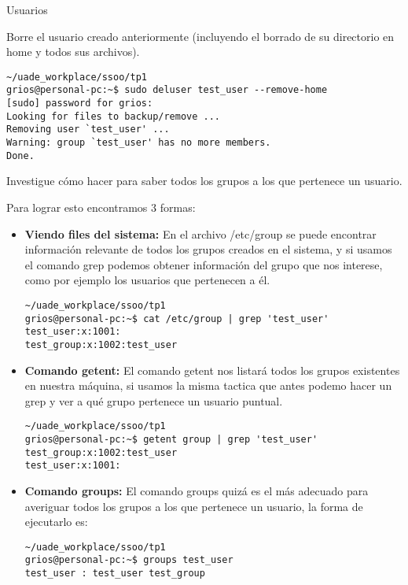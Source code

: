 \begin{section}{Usuarios}
\begin{quoting}
Borre el usuario creado anteriormente (incluyendo el borrado de su directorio en home y todos sus
archivos).
\end{quoting}

\begin{lstlisting}[style=Ubuntu]
~/uade_workplace/ssoo/tp1
grios@personal-pc:~$ sudo deluser test_user --remove-home  
[sudo] password for grios: 
Looking for files to backup/remove ...
Removing user `test_user' ...
Warning: group `test_user' has no more members.
Done.

\end{lstlisting}


\begin{quoting}
Investigue cómo hacer para saber todos los grupos a los que pertenece un usuario.
\end{quoting}

Para lograr esto encontramos 3 formas:

\begin{itemize}

\item \textbf{Viendo files del sistema:}
En el archivo /etc/group se puede encontrar información relevante de todos los grupos creados en el sistema, y si usamos el comando grep podemos obtener información del grupo que nos interese, como por ejemplo los usuarios que pertenecen a él.

\begin{lstlisting}[style=Ubuntu]
~/uade_workplace/ssoo/tp1
grios@personal-pc:~$ cat /etc/group | grep 'test_user'
test_user:x:1001:
test_group:x:1002:test_user
\end{lstlisting}

\item \textbf{Comando getent:}
El comando getent nos listará todos los grupos existentes en nuestra máquina, si usamos la misma tactica que antes podemo hacer un grep y ver a qué grupo pertenece un usuario puntual.

\begin{lstlisting}[style=Ubuntu]
~/uade_workplace/ssoo/tp1
grios@personal-pc:~$ getent group | grep 'test_user'
test_group:x:1002:test_user
test_user:x:1001:
\end{lstlisting}

\item \textbf{Comando groups:}
El comando groups quizá es el más adecuado para averiguar todos los grupos a los que pertenece un usuario, la forma de ejecutarlo es:

\begin{lstlisting}[style=Ubuntu]
~/uade_workplace/ssoo/tp1
grios@personal-pc:~$ groups test_user
test_user : test_user test_group
\end{lstlisting}

\end{itemize}
\end{section}